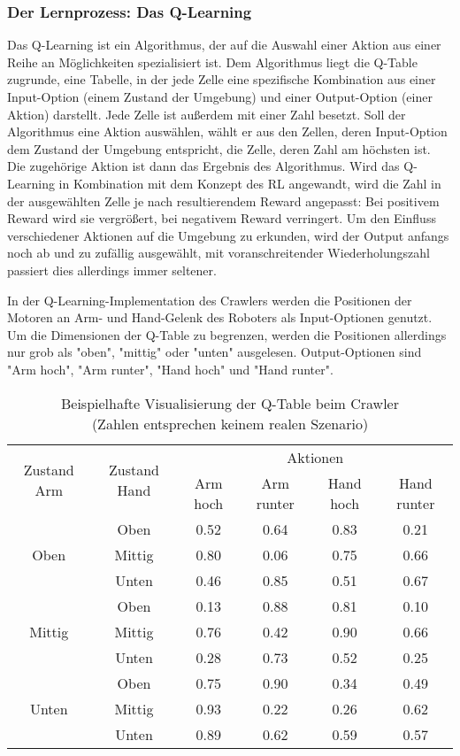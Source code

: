\subsubsection{Der Lernprozess: Das Q-Learning}

Das Q-Learning ist ein Algorithmus, der auf die Auswahl einer Aktion aus einer Reihe an Möglichkeiten spezialisiert ist. Dem Algorithmus liegt die Q-Table zugrunde, eine Tabelle, in der jede Zelle eine spezifische Kombination aus einer Input-Option (einem Zustand der Umgebung) und einer Output-Option (einer Aktion) darstellt. Jede Zelle ist außerdem mit einer Zahl besetzt. Soll der Algorithmus eine Aktion auswählen, wählt er aus den Zellen, deren Input-Option dem Zustand der Umgebung entspricht, die Zelle, deren Zahl am höchsten ist. Die zugehörige Aktion ist dann das Ergebnis des Algorithmus. Wird das Q-Learning in Kombination mit dem Konzept des RL angewandt, wird die Zahl in der ausgewählten Zelle je nach resultierendem Reward angepasst: Bei positivem Reward wird sie vergrößert, bei negativem Reward verringert. Um den Einfluss verschiedener Aktionen auf die Umgebung zu erkunden, wird der Output anfangs noch ab und zu zufällig ausgewählt, mit voranschreitender Wiederholungszahl passiert dies allerdings immer seltener.

In der Q-Learning-Implementation des Crawlers werden die Positionen der Motoren an Arm- und Hand-Gelenk des Roboters als Input-Optionen genutzt. Um die Dimensionen der Q-Table zu begrenzen, werden die Positionen allerdings nur grob als "oben", "mittig" oder "unten" ausgelesen. Output-Optionen sind "Arm hoch", "Arm runter", "Hand hoch" und "Hand runter".

\begin{table}
	\captionsetup{justification=centering}
	\caption{Beispielhafte Visualisierung der Q-Table beim Crawler \\ (Zahlen entsprechen keinem realen Szenario)}
	\centering
	\begin{tabular}{ |c|c|cccc| }
		\hline
	\multirow{2}{4em}{Zustand Arm} & \multirow{2}{4em}{Zustand Hand} & \multicolumn{4}{|c|}{Aktionen} \\
		& & Arm hoch & Arm runter             & Hand hoch & Hand runter \\
		\hline
	\multirow{3}{4em}{Oben} & Oben & 0.52 & 0.64 & 0.83 & 0.21 \\
		& Mittig & 0.80 & 0.06 & 0.75 & 0.66 \\
		& Unten & 0.46 & 0.85 & 0.51 & 0.67 \\
		\hline
	\multirow{3}{4em}{Mittig} & Oben & 0.13 & 0.88 & 0.81 & 0.10 \\
		& Mittig & 0.76 & 0.42 & 0.90 & 0.66 \\
		& Unten & 0.28 & 0.73 & 0.52 & 0.25 \\
	    \hline
	\multirow{3}{4em}{Unten} & Oben & 0.75 & 0.90 & 0.34 & 0.49 \\
		& Mittig & 0.93 & 0.22 & 0.26 & 0.62 \\
		& Unten & 0.89 & 0.62 & 0.59 & 0.57 \\
	    \hline
	\end{tabular}
\end{table}
